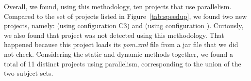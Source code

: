 Overall, we found, using this methodology, ten projects that use
parallelism.  Compared to the set of projects listed in
Figure~\ref{tab:speedup}, we found two new projects, namely:
 (using
configuration C3) and  (using configuration
\ForkSeq{}).  Curiously, we also found that project  was
not detected using this methodology.  That happened because this
project loads its \emph{pom.xml} file from a jar file that we did not
check.  Considering the static and dynamic methods together, we found
a total of 11 distinct projects using parallelism, corresponding to
the union of the two subject sets.

\vspace{1ex}
\begin{center}
\end{center}
\vspace{1ex}



